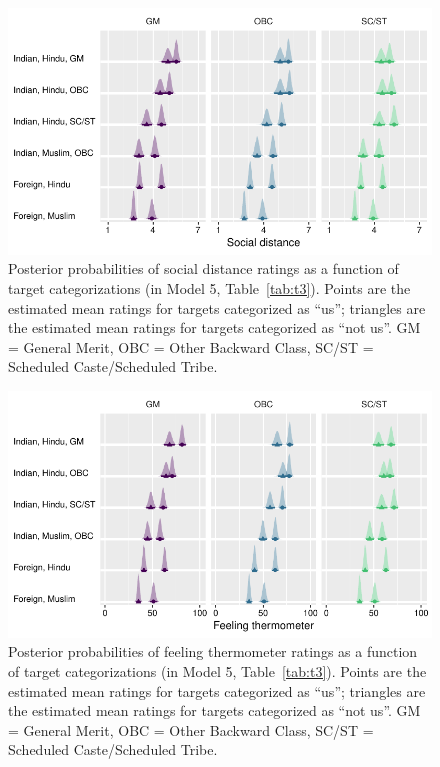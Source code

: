 \documentclass[12pt, a4paper]{article}
\begin{document}
\begin{figure}
\centering
\includegraphics[scale=1]{../figures/figure-5}
\caption{
Posterior probabilities of social distance ratings as a function of target categorizations (in Model 5, Table~\ref{tab:t3}). Points are the estimated mean ratings for targets categorized as ``us''; triangles are the estimated mean ratings for targets categorized as ``not us''. GM = General Merit, OBC = Other Backward Class, SC/ST = Scheduled Caste/Scheduled Tribe.
}
\label{fig:f5}
\end{figure}

\begin{figure}
\centering
\includegraphics[scale=1]{../figures/figure-6}
\caption{
Posterior probabilities of feeling thermometer ratings as a function of target categorizations (in Model 5, Table~\ref{tab:t3}). Points are the estimated mean ratings for targets categorized as ``us''; triangles are the estimated mean ratings for targets categorized as ``not us''. GM = General Merit, OBC = Other Backward Class, SC/ST = Scheduled Caste/Scheduled Tribe.
}
\label{fig:f6}
\end{figure}
\end{document}
